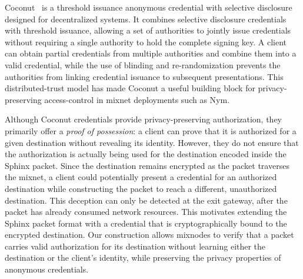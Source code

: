 Coconut~\cite{coconut} is a threshold issuance anonymous credential with selective disclosure designed for decentralized systems. 
It combines selective disclosure credentials with threshold issuance, allowing a set of authorities to jointly issue credentials without requiring a single authority to hold the complete signing key. 
A client can obtain partial credentials from multiple authorities and combine them into a valid credential, while the use of blinding and re-randomization prevents the authorities from linking credential issuance to subsequent presentations. 
This distributed-trust model has made Coconut a useful building block for privacy-preserving access-control in mixnet deployments such as Nym.

Although Coconut credentials provide privacy-preserving authorization, they primarily offer a \emph{proof of possession}: a client can prove that it is authorized for a given destination without revealing its identity. 
However, they do not ensure that the authorization is actually being used for the destination encoded inside the Sphinx packet. 
Since the destination remains encrypted as the packet traverses the mixnet, a client could potentially present a credential for an authorized destination while constructing the packet to reach a different, unauthorized destination.
This deception can only be detected at the exit gateway, after the packet has already consumed network resources. 
This motivates extending the Sphinx packet format with a credential that is cryptographically bound to the encrypted destination. 
Our construction allows mixnodes to verify that a packet carries valid authorization for its destination 
without learning either the destination or the client's identity, while preserving the privacy properties of anonymous credentials.

